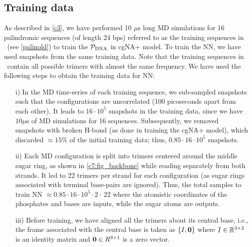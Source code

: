 \subsection{Training data}
As described in \cref{c3}, we have performed 10 $\mu$s long MD simulations for 16 palindromic sequences (of length 24 bps) referred to as the training sequences in \Lbdna \ (see \cref{palinold}) to train the ${\mathcal P}_\text{DNA}$ in cgNA$+$ model.
To train the NN, we have used snapshots from the same training data.
Note that the training sequences in \Lbdna \ contain all possible trimers with almost the same frequency.
We have used the following steps to obtain the training data for NN:
\begin{itemize}
\item[i)] In the MD time-series of each training sequence, we sub-sampled snapshots such that the configurations are uncorrelated (100 picoseconds apart from each other). It leads to $16\cdot10^5$ snapshots in the training data, since we have $10 \mu$s of MD simulations for 16 sequences. Subsequently, we removed snapshots with broken H-bond (as done in training the cgNA$+$ model), which discarded $\approx 15 \%$ of the initial training data; thus, $0.85 \cdot 16\cdot10^5$ snapshots.
\item[ii)] Each MD configuration is split into trimers centered around the middle sugar ring, as shown in \cref{c7:fig_backbone} while reading separately from both strands. 
It led to 22 trimers per strand for each configuration (as sugar rings associated with terminal base-pairs are ignored).
Thus, the total samples to train NN $\approx 0.85 \cdot 16 \cdot 10^5 \cdot 2 \cdot \ 22$ where the atomistic coordinates of the phosphates and bases are inputs, while the sugar atoms are outputs.
\item[iii)] Before training, we have aligned all the trimers about its central base, i.e., the frame associated with the central base is taken as $\{I,\mathbf{0}\}$ where $I \in {\mathbb R}^{3\times3}$ is an identity matrix and $\mathbf{0} \in R^{3\times1}$ is a zero vector. 
\end{itemize} \clearpage


